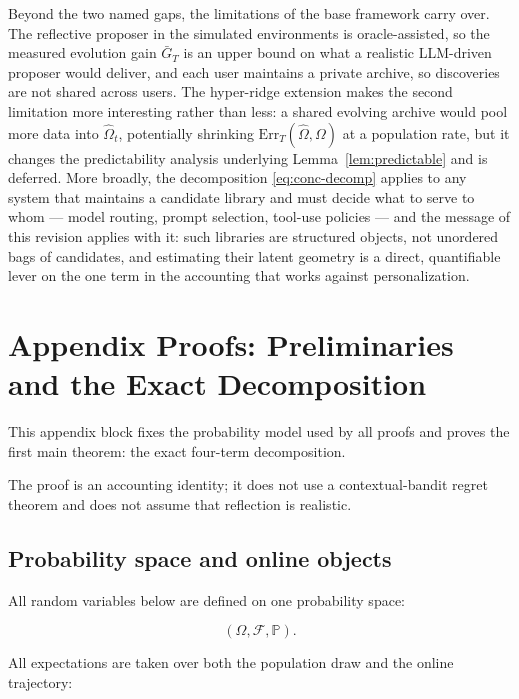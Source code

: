 \documentclass{article} %
\begin{document}
Beyond the two named gaps, the limitations of the base framework carry over. The reflective proposer in the simulated environments is oracle-assisted, so the measured evolution gain $\bar G_T$ is an upper bound on what a realistic LLM-driven proposer would deliver, and each user maintains a private archive, so discoveries are not shared across users. The hyper-ridge extension makes the second limitation more interesting rather than less: a shared evolving archive would pool more data into $\widehat\Omega_t$, potentially shrinking $\mathrm{Err}_T(\widehat\Omega,\Omega)$ at a population rate, but it changes the predictability analysis underlying Lemma~\ref{lem:predictable} and is deferred. More broadly, the decomposition \eqref{eq:conc-decomp} applies to any system that maintains a candidate library and must decide what to serve to whom --- model routing, prompt selection, tool-use policies --- and the message of this revision applies with it: such libraries are structured objects, not unordered bags of candidates, and estimating their latent geometry is a direct, quantifiable lever on the one term in the accounting that works against personalization.

\appendix

\section{Appendix Proofs: Preliminaries and the Exact Decomposition}

\label{app:proofs}

This appendix block fixes the probability model used by all proofs and proves the first main theorem: the exact four-term decomposition.

The proof is an accounting identity; it does not use a contextual-bandit regret theorem and does not assume that reflection is realistic.

\subsection{Probability space and online objects}

All random variables below are defined on one probability space:

\begin{equation}
\label{eq:app-probability-space}
(\Omega,\mathcal{F},\mathbb{P}).
\end{equation}

All expectations are taken over both the population draw and the online trajectory:
\end{document}
